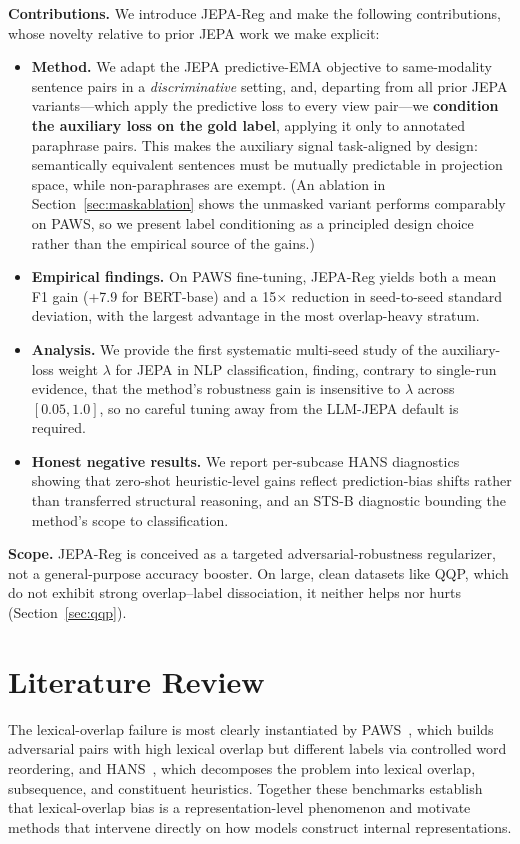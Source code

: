 \documentclass[sigconf]{acmart}
\begin{document}
\textbf{Contributions.} We introduce JEPA-Reg and make the following contributions, whose novelty relative to prior JEPA work we make explicit:
\begin{itemize}
\item \textbf{Method.} We adapt the JEPA predictive-EMA objective to same-modality sentence pairs in a \emph{discriminative} setting, and, departing from all prior JEPA variants---which apply the predictive loss to every view pair---we \textbf{condition the auxiliary loss on the gold label}, applying it only to annotated paraphrase pairs. This makes the auxiliary signal task-aligned by design: semantically equivalent sentences must be mutually predictable in projection space, while non-paraphrases are exempt. (An ablation in Section~\ref{sec:maskablation} shows the unmasked variant performs comparably on PAWS, so we present label conditioning as a principled design choice rather than the empirical source of the gains.)
\item \textbf{Empirical findings.} On PAWS fine-tuning, JEPA-Reg yields both a mean F1 gain (+7.9 for BERT-base) and a 15$\times$ reduction in seed-to-seed standard deviation, with the largest advantage in the most overlap-heavy stratum.
\item \textbf{Analysis.} We provide the first systematic multi-seed study of the auxiliary-loss weight $\lambda$ for JEPA in NLP classification, finding, contrary to single-run evidence, that the method's robustness gain is insensitive to $\lambda$ across $[0.05, 1.0]$, so no careful tuning away from the LLM-JEPA default is required.
\item \textbf{Honest negative results.} We report per-subcase HANS diagnostics showing that zero-shot heuristic-level gains reflect prediction-bias shifts rather than transferred structural reasoning, and an STS-B diagnostic bounding the method's scope to classification.
\end{itemize}

\textbf{Scope.} JEPA-Reg is conceived as a targeted adversarial-robustness regularizer, not a general-purpose accuracy booster. On large, clean datasets like QQP, which do not exhibit strong overlap--label dissociation, it neither helps nor hurts (Section~\ref{sec:qqp}).

\section{Literature Review}
The lexical-overlap failure is most clearly instantiated by PAWS~\cite{zhang2019paws}, which builds adversarial pairs with high lexical overlap but different labels via controlled word reordering, and HANS~\cite{mccoy2019right}, which decomposes the problem into lexical overlap, subsequence, and constituent heuristics. Together these benchmarks establish that lexical-overlap bias is a representation-level phenomenon and motivate methods that intervene directly on how models construct internal representations.
\end{document}

